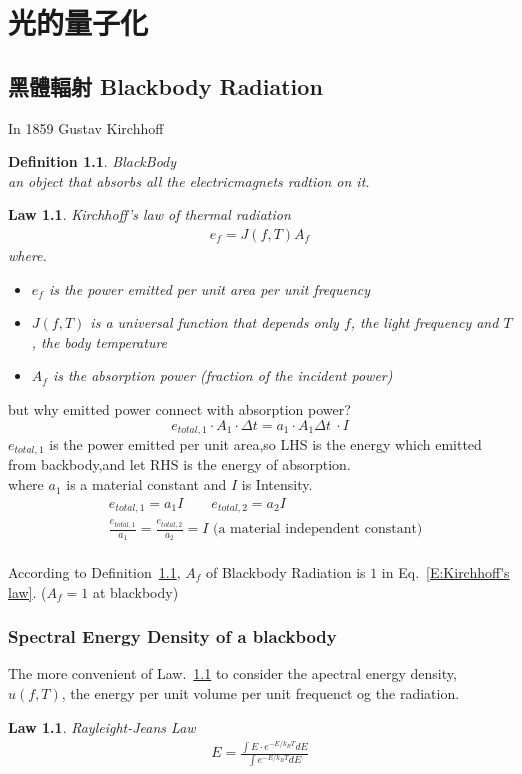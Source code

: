 \documentclass[12pt,a4paper]{book}
\newtheorem{defn}[thm]{Definition}
\newtheorem{laws}[thm]{Law}
\begin{document}
	\chapter{光的量子化}
	\section{黑體輻射 Blackbody Radiation}
	In 1859 Gustav Kirchhoff 
	\begin{defn}\label{D:BlackBody}
		BlackBody\\
		 an object that absorbs all the electricmagnets radtion on it.
	\end{defn}
	\begin{laws}\label{L:Kirchhoff's law of thermal radiation}
		Kirchhoff's law of thermal radiation\\
		\begin{align}e_f=J(f,T)A_f\label{E:Kirchhoff's law}\end{align}
	where.
	\begin{itemize}
		\item $e_f$ is the power emitted per unit area per unit frequency
		\item $J(f,T)$ is a universal function that depends only $f$, the light frequency and $T$, the body temperature
		\item $A_f$ is the absorption power (fraction of the incident power)
	\end{itemize}
	\end{laws}
	but why emitted power connect with absorption power?
	\[e_{total,1} \cdot A_1 \cdot \Delta t = a_1 \cdot A_1 \Delta t\ \cdot I\]
	$e_{total,1}$ is the power emitted per unit area,so LHS is the energy which emitted from backbody,and let RHS is the energy of absorption.\\
	where $a_1$ is a material constant and $I$ is Intensity.
	\begin{align*}
		&e_{total,1} = a_1I\qquad e_{total,2} = a_2I\\
		&\frac{e_{total,1}}{a_1}=\frac{e_{total,2}}{a_2}=I\mbox{ (a material independent constant)}
	\end{align*}
	\\
	According to Definition~\ref{D:BlackBody}, $A_f$ of Blackbody Radiation is $1$ in Eq.~\ref{E:Kirchhoff's law}. ($A_f=1$ at blackbody)
	
		\subsection{Spectral Energy Density of a blackbody}
		The more convenient of Law.~\ref{L:Kirchhoff's law of thermal radiation} to consider
		the apectral energy density, $u(f,T)$, the energy per unit volume per unit frequenct og the radiation.
		\begin{laws}\label{L:Rayleight-Jeans Law}
			Rayleight-Jeans Law\\
			\begin{align}
			E=\frac{\int E \cdot e^{-E/k_BT}dE}{\int e^{-E/k_BT}dE}
			\end{align}
		\end{laws}
\end{document}
